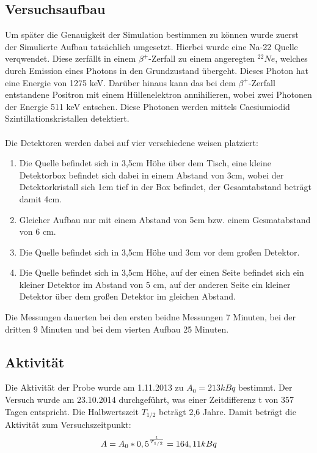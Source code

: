 \documentclass[a4paper,14pt,twoside]{article}
\begin{document}
\subsection{Versuchsaufbau}
Um später die Genauigkeit der Simulation bestimmen zu können wurde zuerst der Simulierte Aufbau tatsächlich umgesetzt. Hierbei wurde eine Na-22 Quelle verqwendet. Diese zerfällt in einem $\beta^+$-Zerfall zu einem angeregten $^{22}Ne$, welches durch Emission eines Photons in den Grundzustand übergeht. Dieses Photon hat eine Energie von 1275 keV. Darüber hinaus kann das bei dem $\beta^+$-Zerfall entstandene Positron mit einem Hüllenelektron annihilieren, wobei zwei Photonen der Energie 511 keV entsehen.
Diese Photonen werden mittels Caesiumiodid Szintillationskristallen detektiert. \\\\Die Detektoren werden dabei auf vier verschiedene weisen platziert:
\begin{enumerate}
\item Die Quelle befindet sich in 3,5cm Höhe über dem Tisch, eine kleine Detektorbox befindet sich dabei in einem Abstand von 3cm, wobei der Detektorkristall sich 1cm tief in der Box befindet, der Gesamtabstand beträgt damit 4cm.
\item Gleicher Aufbau nur mit einem Abstand von 5cm bzw. einem Gesmatabstand von 6 cm.
\item Die Quelle befindet sich in 3,5cm Höhe und 3cm vor dem großen Detektor.
\item Die Quelle befindet sich in 3,5cm Höhe, auf der einen Seite befindet sich ein kleiner Detektor im Abstand von 5 cm, auf der anderen Seite ein kleiner Detektor über dem großen Detektor im gleichen Abstand.
\end{enumerate}
Die Messungen dauerten bei den ersten beidne Messungen 7 Minuten, bei der dritten 9 Minuten und bei dem vierten Aufbau 25 Minuten.


\subsection{Aktivität}
Die Aktivität der Probe wurde am 1.11.2013 zu $A_0=213 kBq$ bestimmt. Der Versuch wurde am 23.10.2014 durchgeführt, was einer Zeitdifferenz t von 357 Tagen entspricht. Die Halbwertszeit $T_{1/2}$ beträgt 2,6 Jahre. Damit beträgt die Aktivität zum Versuchszeitpunkt:
\begin{equation}
A=A_0*0,5^{t\over T_{1/2}}=164,11 kBq
\end{equation}
\end{document}
